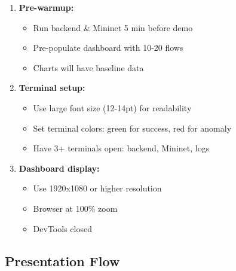 \documentclass[12pt,a4paper]{article}
\begin{document}
\begin{enumerate}
    \item \textbf{Pre-warmup:}
    \begin{itemize}
        \item Run backend \& Mininet 5 min before demo
        \item Pre-populate dashboard with 10-20 flows
        \item Charts will have baseline data
    \end{itemize}
    
    \item \textbf{Terminal setup:}
    \begin{itemize}
        \item Use large font size (12-14pt) for readability
        \item Set terminal colors: green for success, red for anomaly
        \item Have 3+ terminals open: backend, Mininet, logs
    \end{itemize}
    
    \item \textbf{Dashboard display:}
    \begin{itemize}
        \item Use 1920x1080 or higher resolution
        \item Browser at 100\% zoom
        \item DevTools closed
    \end{itemize}
\end{enumerate}

\subsection{Presentation Flow}
\end{document}
